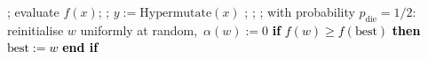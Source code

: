 \documentclass[lettersize,journal]{IEEEtran}
\newcommand{\rev}[1]{\textcolor{black}{#1}}
\begin{document}
\begin{algorithm}[t] 
 	    \caption{$(1+1)$~Opt-IA$_{\textsc{LastBest}}$ }
     \begin{algorithmic}[1]  ;      
 	           \STATE evaluate $f(x)$;    
 	             ;
\STATE $y:=\text{Hypermutate}(x)$
 	            ;
 	            \ELSE
 	            ;
 	            \ENDIF
 	            ;
 	           \ENDIF
{}
 	            \STATE with probability $p_{\text{die}}=1/2$:
 	            \STATE \hspace{\algorithmicindent}
 	            reinitialise $w$ uniformly at random,\ $\alpha(w):=0$
 	            \textcolor{black}{\STATE \hspace{\algorithmicindent}
 	            	\textbf{if} $f(w) \geq f(\text{best})$ \textbf{then}
 	            	\STATE \hspace{2\algorithmicindent}
 	            	$\text{best}:=w$
 	            	\STATE \hspace{\algorithmicindent}
 	            	\textbf{end if}}
 	            \ENDIF
 	            \ENDFOR
 	         \rev{   
 	            \ENDIF}
\ENDWHILE
 	   \end{algorithmic} \label{alg:alg1+ageing}
 	\end{algorithm}
\end{document}
